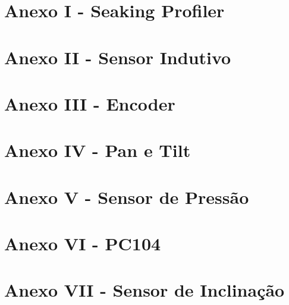 \appendix
\section{Anexo I - Seaking Profiler} 
\label{seaking_profiler} 




\appendix
\section{Anexo II - Sensor Indutivo} 
\label{datasheet_indutivo} 




\appendix
\section{Anexo III - Encoder} 
\label{datasheet_encoder} 



\appendix
\section{Anexo IV - Pan e Tilt} 
\label{datasheet_pantilt} 




\appendix
\section{Anexo V - Sensor de Pressão} 
\label{datasheet_pressao} 


\appendix
\section{Anexo VI - PC104} 
\label{datasheet_pc104} 


\appendix
\section{Anexo VII - Sensor de Inclinação} 
\label{datasheet_inclinacao} 
